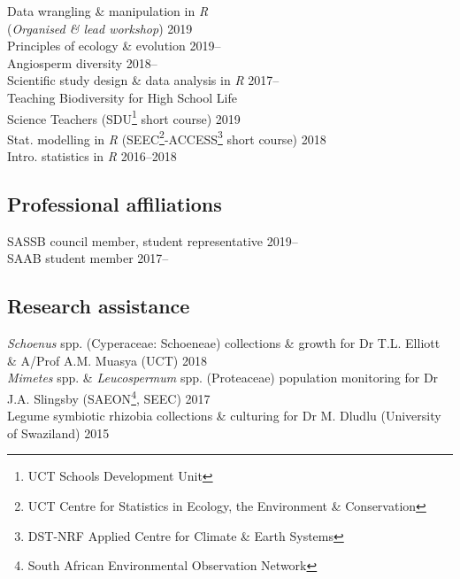 \documentclass[10pt]{article}
\begin{document}
\begin{multicols}{2}
Data wrangling \& manipulation in \textit{R} \\
\hspace{2em} (\textit{Organised \& lead workshop})       \hfill {\small 2019} \\
Principles of ecology \& evolution                     \hfill {\small 2019--} \\
Angiosperm diversity                                   \hfill {\small 2018--} \\
Scientific study design \& data analysis in \textit{R} \hfill {\small 2017--} \\
Teaching Biodiversity for High School Life \\
\hspace{2em} Science Teachers {\small (SDU\footnote{UCT Schools Development 
  Unit} short course)}                                   \hfill {\small 2019} \\
Stat. modelling in \textit{R} {\small (SEEC\footnote{UCT Centre for 
  Statistics in Ecology, the Environment \& Conservation}-ACCESS\footnote{
  DST-NRF Applied Centre for Climate \& Earth Systems} short course)}
                                                         \hfill {\small 2018} \\
Intro. statistics in \textit{R}                       \hfill {\small 2016--2018}

\subsection*{Professional affiliations} %

SASSB council member, student representative           \hfill {\small 2019--} \\
SAAB student member                                       \hfill {\small 2017--}

\end{multicols}

\subsection*{Research assistance} %

\textit{Schoenus} spp. (Cyperaceae: Schoeneae) collections \& growth for Dr
  T.L. Elliott \& A/Prof A.M. Muasya {\small (UCT)}      \hfill {\small 2018} \\
\textit{Mimetes} spp. \& \textit{Leucospermum} spp. (Proteaceae) population 
  monitoring for Dr J.A. Slingsby {\small (SAEON\footnote{South African 
  Environmental Observation Network}, SEEC)}             \hfill {\small 2017} \\
Legume symbiotic rhizobia collections \& culturing for Dr M. Dludlu 
  {\small (University of Swaziland)}                        \hfill {\small 2015}
\end{document}
